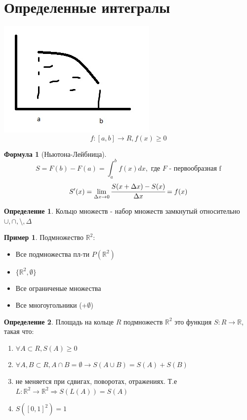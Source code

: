 \documentclass[a4paper]{article}
\theoremstyle{definition}
\newtheorem*{definition*}{Определение}
\newtheorem*{exmp}{Пример}
\newtheorem*{formula}{Формула}
\numberwithin{theorem}{subsection}
\numberwithin{lemma}{subsection}
\numberwithin{definition}{subsection}
\numberwithin{comment*}{subsection}
\numberwithin{consequence}{subsection}
\numberwithin{property}{subsection}
\begin{document}
\section{Определенные интегралы}
\includegraphics{opr_int}
$$ f:[a,b] \rightarrow R, f(x) \geq 0$$
\begin{formula}[Ньютона-Лейбница]
 $$S = F(b)-F(a) =  \int_a^b f(x) dx, \text{ где } F \text{ - первообразная f}$$
 $$S'(x) = \lim_{\Delta x \rightarrow 0}{\cfrac{S(x +\Delta x)-S(x)}{\Delta x}} = f(x) $$
\end{formula}
\begin{definition*}
 Кольцо множеств - набор множеств замкнутый относительно
 $\cup, \cap, \setminus , \Delta  $
\end{definition*}
\begin{exmp}
 Подмножество $\mathbb{R}^2: $
 \begin{itemize}
  \item Все подмножества пл-ти $P(\mathbb{R}^2)$
  \item $\{\mathbb{R}^2, \emptyset\}$
  \item Все ограниченые множества
  \item Все многоугольники (+$\emptyset$)
 \end{itemize}
\end{exmp}
\begin{definition*}
 Площадь на кольце $R$ подмножеств $\mathbb{R}^2$ это функция $S: R \rightarrow \mathbb{R}$, такая что:
 \begin{enumerate}
  \item $\forall{A} \subset R, S(A) \geq 0$
  \item $ \forall{A,B} \subset R, A\cap B = \emptyset \rightarrow S(A\cup B) = S(A) + S(B)$
  \item не меняется при сдвигах, поворотах, отражениях. Т.е $L:\mathbb{R}^2 \rightarrow \mathbb{R}^2 \Rightarrow S(L(A)) = S(A)$
  \item $S([0,1]^2) = 1$
 \end{enumerate}
\end{definition*}
\end{document}
